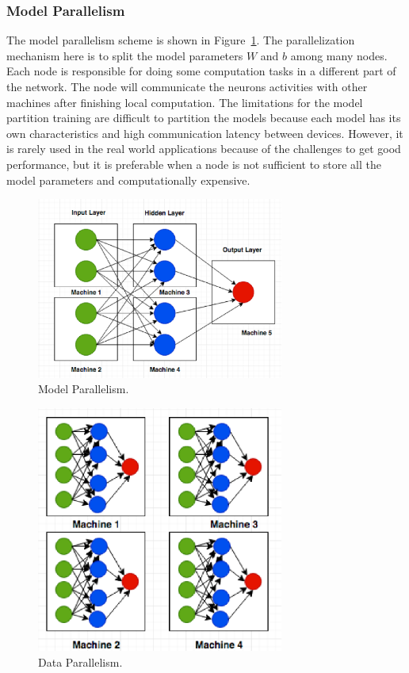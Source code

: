 \documentclass[conference]{IEEEtran}
\begin{document}
\subsubsection{Model Parallelism}
\label{sec:mp}

The model parallelism scheme is shown in Figure~\ref{fig:Model_Para}. The parallelization mechanism here is to split the model parameters $W$ and $b$ among many nodes. Each node is responsible for doing some computation tasks in a different part of the network. The node will communicate the neurons activities with other machines after finishing local computation. The limitations for the model partition training are difficult to partition the models because each model has its own characteristics and high communication latency between devices. However, it is rarely used in the real world applications because of the challenges to get good performance, but it is preferable when a node is not sufficient to store all the model parameters and computationally expensive.

\begin{figure}[htb]
  \includegraphics[width=3.2in]{Fig/Model_Para}
  \caption{Model Parallelism.}
  \label{fig:Model_Para}
\end{figure}

\begin{figure}[htb]
  \includegraphics[width=3.2in]{Fig/Data_Para}
  \caption{Data Parallelism.}
  \label{fig:Data_Para}
\end{figure}
\end{document}
